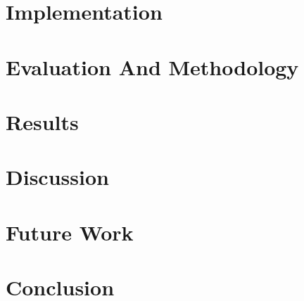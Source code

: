 \documentclass{report}
\begin{document}
\chapter{Implementation}


\chapter{Evaluation And Methodology}


\chapter{Results}


\chapter{Discussion}


\chapter{Future Work}


\chapter{Conclusion}


\newpage

%  
% 
\end{document}

